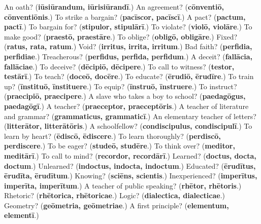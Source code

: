 \begin{tcolorbox}[breakable,colback=teal!4,colframe=teal!35!black,title={Before you move on}]
An oath? (\textbf{iūsiūrandum, iūrisiūrandī}.) An agreement? (\textbf{cōnventiō, cōnventiōnis}.) To strike a bargain? (\textbf{pacīscor, pacīscī}.) A pact? (\textbf{pactum, pactī}.) To bargain for? (\textbf{stipulor, stipulārī}.) To violate? (\textbf{violō, violāre}.) To make good? (\textbf{praestō, praestāre}.) To oblige? (\textbf{obligō, obligāre}.) Fixed? (\textbf{ratus, rata, ratum}.) Void? (\textbf{irritus, irrita, irritum}.) Bad faith? (\textbf{perfidia, perfidiae}.) Treacherous? (\textbf{perfidus, perfida, perfidum}.) A deceit? (\textbf{fallācia, fallāciae}.) To deceive? (\textbf{dēcipiō, dēcipere}.) To call to witness? (\textbf{testor, testārī}.) To teach? (\textbf{doceō, docēre}.) To educate? (\textbf{ērudiō, ērudīre}.) To train up? (\textbf{īnstituō, īnstituere}.) To equip? (\textbf{īnstruō, īnstruere}.) To instruct? (\textbf{praecipiō, praecipere}.) A slave who takes a boy to school? (\textbf{paedagōgus, paedagōgī}.) A teacher? (\textbf{praeceptor, praeceptōris}.) A teacher of literature and grammar? (\textbf{grammaticus, grammaticī}.) An elementary teacher of letters? (\textbf{litterātor, litterātōris}.) A schoolfellow? (\textbf{condiscipulus, condiscipulī}.) To learn by heart? (\textbf{ēdiscō, ēdiscere}.) To learn thoroughly? (\textbf{perdiscō, perdiscere}.) To be eager? (\textbf{studeō, studēre}.) To think over? (\textbf{meditor, meditārī}.) To call to mind? (\textbf{recordor, recordārī}.) Learned? (\textbf{doctus, docta, doctum}.) Unlearned? (\textbf{indoctus, indocta, indoctum}.) Educated? (\textbf{ērudītus, ērudīta, ērudītum}.) Knowing? (\textbf{sciēns, scientis}.) Inexperienced? (\textbf{imperītus, imperīta, imperītum}.) A teacher of public speaking? (\textbf{rhētor, rhētoris}.) Rhetoric? (\textbf{rhētorica, rhētoricae}.) Logic? (\textbf{dialectica, dialecticae}.) Geometry? (\textbf{geōmetria, geōmetriae}.) A first principle? (\textbf{elementum, elementī}.)
\end{tcolorbox}
